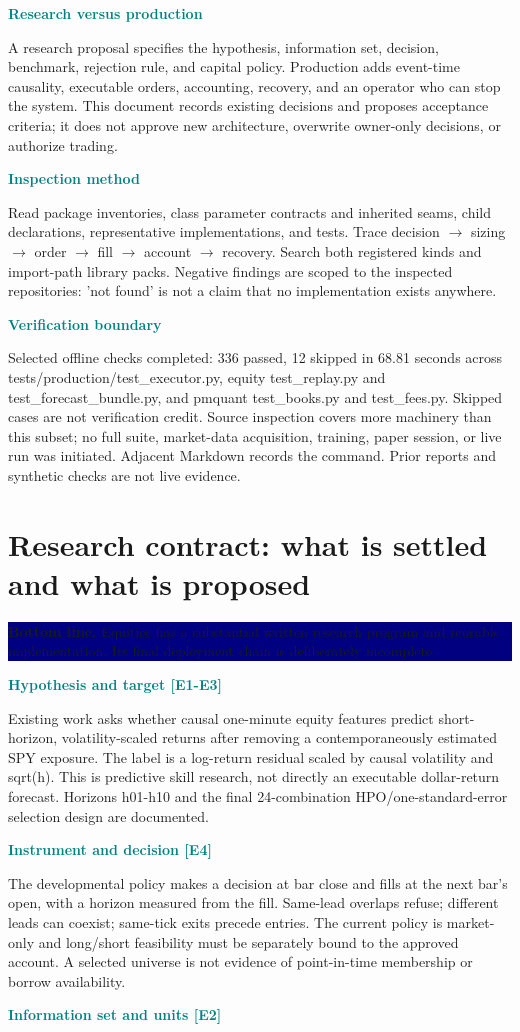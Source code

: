 \documentclass[10pt,letterpaper]{article}
\newcommand{\bl}[1]{\noindent\colorbox{navy}{\parbox{\dimexpr\linewidth-2\fboxsep}{\color{white}\textbf{Bottom line.} #1}}\par\medskip}
\newcommand{\topic}[2]{\clearpage\section{#1}\bl{#2}}
\newcommand{\sub}[1]{\par\textbf{\textcolor{teal}{#1}}\par}
\begin{document}
\sub{Research versus production}
A research proposal specifies the hypothesis, information set, decision, benchmark, rejection rule, and capital policy. Production adds event-time causality, executable orders, accounting, recovery, and an operator who can stop the system. This document records existing decisions and proposes acceptance criteria; it does not approve new architecture, overwrite owner-only decisions, or authorize trading.
\sub{Inspection method}
Read package inventories, class parameter contracts and inherited seams, child declarations, representative implementations, and tests. Trace decision $\rightarrow$ sizing $\rightarrow$ order $\rightarrow$ fill $\rightarrow$ account $\rightarrow$ recovery. Search both registered kinds and import-path library packs. Negative findings are scoped to the inspected repositories: 'not found' is not a claim that no implementation exists anywhere.
\sub{Verification boundary}
Selected offline checks completed: 336 passed, 12 skipped in 68.81 seconds across tests/production/test\_executor.py, equity test\_replay.py and test\_forecast\_bundle.py, and pmquant test\_books.py and test\_fees.py. Skipped cases are not verification credit. Source inspection covers more machinery than this subset; no full suite, market-data acquisition, training, paper session, or live run was initiated. Adjacent Markdown records the command. Prior reports and synthetic checks are not live evidence.
\topic{Research contract: what is settled and what is proposed}{Equities has a substantial written research program and reusable implementation. Its final deployment chain is deliberately incomplete.}
\sub{Hypothesis and target [E1-E3]}
Existing work asks whether causal one-minute equity features predict short-horizon, volatility-scaled returns after removing a contemporaneously estimated SPY exposure. The label is a log-return residual scaled by causal volatility and sqrt(h). This is predictive skill research, not directly an executable dollar-return forecast. Horizons h01-h10 and the final 24-combination HPO/one-standard-error selection design are documented.
\sub{Instrument and decision [E4]}
The developmental policy makes a decision at bar close and fills at the next bar's open, with a horizon measured from the fill. Same-lead overlaps refuse; different leads can coexist; same-tick exits precede entries. The current policy is market-only and long/short feasibility must be separately bound to the approved account. A selected universe is not evidence of point-in-time membership or borrow availability.
\sub{Information set and units [E2]}
\end{document}
